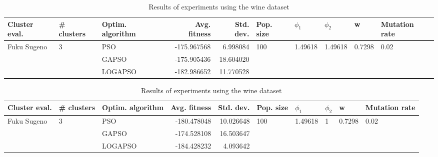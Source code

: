 \documentclass{article}
\begin{document}
\begin{table}
\centering
\caption{Results of experiments using the wine dataset}
\begin{tabular}{lllrrlllll}
\toprule
               Cluster eval. &        \# clusters & Optim. algorithm &  Avg. fitness &  Std. dev. &            Pop. size &               $\phi_{1}$ &               $\phi_{2}$ &                       w &         Mutation rate \\
\midrule
\multirow{3}{*}{Fuku Sugeno} & \multirow{3}{*}{3} &              PSO &   -175.967568 &   6.998084 & \multirow{3}{*}{100} & \multirow{3}{*}{1.49618} & \multirow{3}{*}{1.49618} & \multirow{3}{*}{0.7298} & \multirow{3}{*}{0.02} \\
                             &                    &            GAPSO &   -175.905436 &  18.604020 &                      &                          &                          &                         &                       \\
                             &                    &          LOGAPSO &   -182.986652 &  11.770528 &                      &                          &                          &                         &                       \\
\bottomrule
\end{tabular}
\end{table}
\begin{table}
\centering
\caption{Results of experiments using the wine dataset}
\begin{tabular}{lllrrlllll}
\toprule
               Cluster eval. &        \# clusters & Optim. algorithm &  Avg. fitness &  Std. dev. &            Pop. size &               $\phi_{1}$ &         $\phi_{2}$ &                       w &         Mutation rate \\
\midrule
\multirow{3}{*}{Fuku Sugeno} & \multirow{3}{*}{3} &              PSO &   -180.478048 &  10.026648 & \multirow{3}{*}{100} & \multirow{3}{*}{1.49618} & \multirow{3}{*}{1} & \multirow{3}{*}{0.7298} & \multirow{3}{*}{0.02} \\
                             &                    &            GAPSO &   -174.528108 &  16.503647 &                      &                          &                    &                         &                       \\
                             &                    &          LOGAPSO &   -184.428232 &   4.093642 &                      &                          &                    &                         &                       \\
\bottomrule
\end{tabular}
\end{table}
\end{document}
